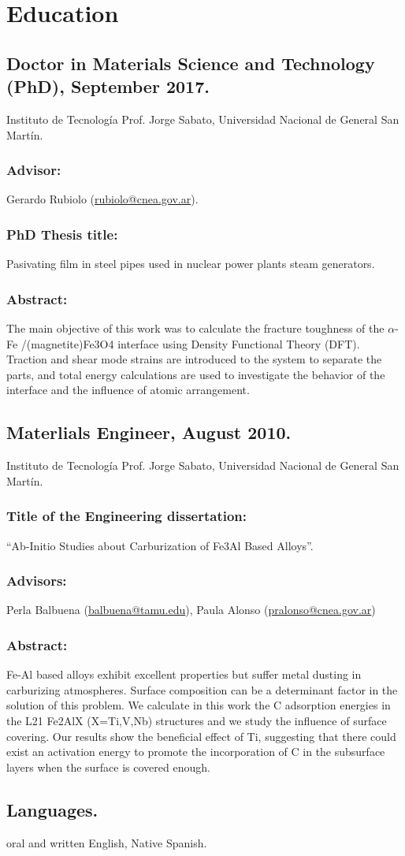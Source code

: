 \section{Education}

\subsection{Doctor in Materials Science and Technology (PhD), September 2017.} Instituto de
Tecnología Prof. Jorge Sabato, Universidad Nacional de General San Martín. \subsubsection{Advisor:}
Gerardo Rubiolo (\url{rubiolo@cnea.gov.ar}).
\subsubsection{PhD Thesis title:} Pasivating film in steel pipes used in nuclear power plants steam
generators.
\subsubsection{Abstract:} The main objective of this work was to calculate the fracture toughness of the $\alpha$-Fe /(magnetite)Fe3O4 interface using Density Functional Theory (DFT). Traction and
shear mode strains are introduced to the system to separate the parts, and total energy
calculations are used to investigate the behavior of the interface and the influence of
atomic arrangement.

\subsection{Materlials Engineer, August 2010.} Instituto de Tecnología Prof. Jorge Sabato,
Universidad Nacional de General San Martín.
\subsubsection{Title of the Engineering dissertation:} “Ab-Initio Studies about Carburization of Fe3Al Based Alloys”.
\subsubsection{Advisors:} Perla Balbuena (\url{balbuena@tamu.edu}), Paula Alonso (\url{pralonso@cnea.gov.ar})
\subsubsection{Abstract:} Fe-Al based alloys exhibit excellent properties but suffer metal dusting in
carburizing atmospheres. Surface composition can be a determinant factor in the solution
of this problem. We calculate in this work the C adsorption energies in the L21 Fe2AlX
(X=Ti,V,Nb) structures and we study the influence of surface covering. Our results show
the beneficial effect of Ti, suggesting that there could exist an activation energy to promote
the incorporation of C in the subsurface layers when the surface is covered enough.
\subsection{Languages.} oral and written English, Native Spanish.

